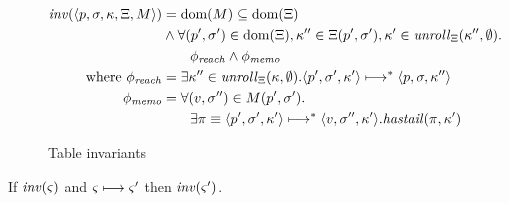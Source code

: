 \begin{figure}
  \centering
  \begin{align*}
    \mathit{inv}(\langle p, \sigma, \kappa, \Xi, M \rangle) &=
    \text{dom}(M) \subseteq \text{dom}(\Xi) \\
    &\wedge \forall (p',\sigma') \in \text{dom}(\Xi), \kappa''
    \in \Xi(p',\sigma'),
    \kappa' \in \mathit{unroll}_{\Xi}(\kappa'', \emptyset). \\
    &\qquad \phi_{\mathit{reach}} \wedge \phi_{\mathit{memo}} \\
    \text{where } \phi_{\mathit{reach}} &= \exists \kappa'' \in
    \mathit{unroll}_{\Xi}(\kappa,\emptyset).
    \langle p', \sigma', \kappa' \rangle \longmapsto^* \langle p, \sigma, \kappa'' \rangle \\
    \phi_{\mathit{memo}} &=
    \forall (v, \sigma'') \in M(p',\sigma'). \\
    &\qquad\exists \pi\equiv\langle p', \sigma', \kappa' \rangle \longmapsto^* \langle v,\sigma'',\kappa' \rangle. \mathit{hastail}(\pi,\kappa')
  \end{align*}
  \caption{Table invariants}
\label{fig:inv}
\end{figure}
\begin{lemma}\label{lem:tab-inv}
  If $\mathit{inv}(\varsigma)$ and $\varsigma \longmapsto \varsigma'$ then $\mathit{inv}(\varsigma')$.
\end{lemma}
